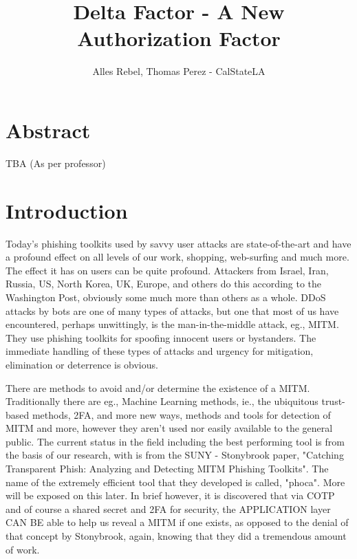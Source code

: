 \documentclass[a4paper, 11pt]{article} 				%
\title{Delta Factor - A New Authorization Factor}
\author{Alles Rebel, Thomas Perez - CalStateLA}
\begin{document}
\maketitle



\section{Abstract}
TBA (As per professor) %
\section{Introduction}
\setlength{\baselineskip}{1.5\baselineskip}
\indent

Today’s phishing toolkits used by savvy user attacks are state-of-the-art and have a profound effect on all levels of our work, shopping, web-surfing and much more. The effect it has on users can be quite profound. Attackers from Israel, Iran, Russia, US, North Korea, UK, Europe, and others do this according to the Washington Post, obviously some much more than others as a whole. DDoS attacks by bots are one of many types of attacks, but one that most of us have encountered, perhaps unwittingly, is the  man-in-the-middle attack, eg., MITM. They use phishing toolkits for spoofing innocent users or bystanders. The immediate handling of these types of attacks and urgency for mitigation, elimination or deterrence is obvious. 

There are methods to avoid and/or determine the existence of a MITM. Traditionally there are eg., Machine Learning methods, ie., the ubiquitous trust-based methods, 2FA, and more new ways, methods and tools for detection of MITM and more, however they aren't used nor easily available to the general public.
The current status in the field including the best performing tool is from the basis of our research, with is from the SUNY - Stonybrook paper, "Catching Transparent Phish: Analyzing and Detecting MITM  Phishing Toolkits". The name of the extremely efficient tool that they developed is called, "phoca".
More will be exposed on this later. In brief however, it is discovered that via COTP and of course a shared secret and 2FA for security, the APPLICATION layer CAN BE able to help us reveal a MITM if one exists, as opposed to the denial of that concept by Stonybrook, again, knowing that they did a tremendous amount of work. 
\end{document}
